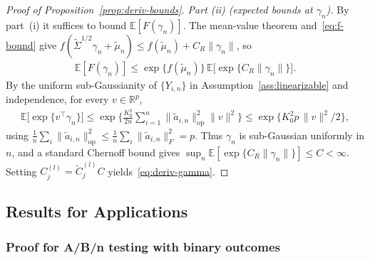 \documentclass[12pt]{article}
\newcommand{\op}{\mathrm{op}}
\newcommand{\real}{\mathbb{R}}
\newcommand{\Ee}{{\mathbb{E}}}
\begin{document}
\begin{appendices}
\begin{proof}[Proof of Proposition~\ref{prop:deriv-bounds}]
\medskip
\textit{Part (ii) (expected bounds at $\gamma_n$).}
By part~(i) it suffices to bound $\Ee[F(\gamma_n)]$. The mean-value
theorem and~\eqref{eq:f-bound} give
$f(\widetilde\Sigma^{1/2}\gamma_n+\widetilde\mu_n)
\le f(\widetilde\mu_n)+C_R\|\gamma_n\|$, so
\begin{align*}
  \Ee[F(\gamma_n)]
  \le\exp\{f(\widetilde\mu_n)\}\,\Ee\big[\exp\{C_R\|\gamma_n\|\}\big].
\end{align*}
By the uniform sub-Gaussianity of $\{Y_{i,n}\}$ in
Assumption~\ref{ass:linearizable} and independence, for every
$v\in\real^p$,
\begin{align*}
  \Ee\big[\exp\{v^\top\gamma_n\}\big]
  \le\exp\Big\{\frac{K_0^2}{2n}\sum_{i=1}^n
     \|\widetilde a_{i,n}\|_{\op}^2\|v\|^2\Big\}
  \le\exp\{K_0^2 p\,\|v\|^2/2\},
\end{align*}
using $\frac1n\sum_i\|\widetilde a_{i,n}\|_{\op}^2
\le\frac1n\sum_i\|\widetilde a_{i,n}\|_F^2=p$. Thus $\gamma_n$ is
sub-Gaussian uniformly in $n$, and a standard Chernoff bound gives
$\sup_n\Ee[\exp\{C_R\|\gamma_n\|\}]\le C<\infty$. Setting
$C_j^{(l)}=\widetilde C_j^{(l)}C$ yields~\eqref{eq:deriv-gamma}.
\end{proof}


\subsection{Results for Applications}

\subsubsection{Proof for A/B/n testing with binary outcomes}


\end{appendices}
\end{document}
